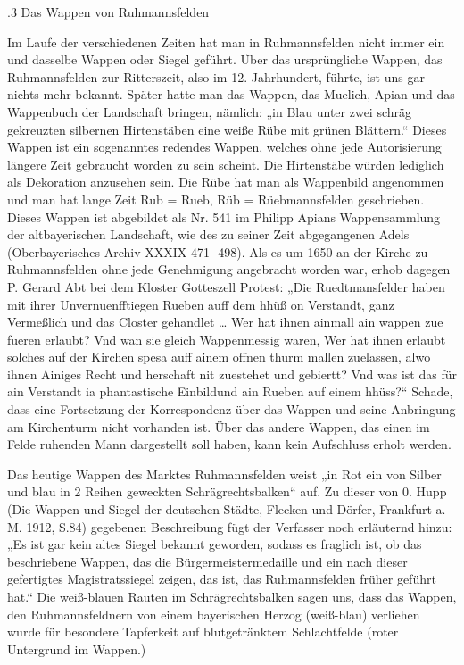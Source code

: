 \documentclass[12pt,a4paper]{book}
\begin{document}
.3 Das Wappen von Ruhmannsfelden

Im Laufe der verschiedenen Zeiten hat man in Ruhmannsfelden nicht immer ein und
dasselbe Wappen oder Siegel geführt. Über das ursprüngliche Wappen, das
Ruhmannsfelden zur Ritterszeit, also im 12. Jahrhundert, führte, ist uns gar
nichts mehr bekannt. Später hatte man das Wappen, das Muelich, Apian und das
Wappenbuch der Landschaft bringen, nämlich: „in Blau unter zwei schräg
gekreuzten silbernen Hirtenstäben eine weiße Rübe mit grünen Blättern.“ Dieses
Wappen ist ein sogenanntes redendes Wappen, welches ohne jede Autorisierung
längere Zeit gebraucht worden zu sein scheint. Die Hirtenstäbe würden lediglich
als Dekoration anzusehen sein. Die Rübe hat man als Wappenbild angenommen und
man hat lange Zeit Rub = Rueb, Rüb = Rüebmannsfelden geschrieben. Dieses Wappen
ist abgebildet als Nr. 541 im Philipp Apians Wappensammlung der altbayerischen
Landschaft, wie des zu seiner Zeit abgegangenen Adels (Oberbayerisches Archiv
XXXIX 471- 498). Als es um 1650 an der Kirche zu Ruhmannsfelden ohne jede
Genehmigung angebracht worden war, erhob dagegen P. Gerard Abt bei dem Kloster
Gotteszell Protest: „Die Ruedtmansfelder haben mit ihrer Unvernuenfftiegen
Rueben auff dem hhüß on Verstandt, ganz Vermeßlich und das Closter gehandlet …
Wer hat ihnen ainmall ain wappen zue fueren erlaubt? Vnd wan sie gleich
Wappenmessig waren, Wer hat ihnen erlaubt solches auf der Kirchen spesa auff
ainem offnen thurm mallen zuelassen, alwo ihnen Ainiges Recht und herschaft nit
zuestehet und gebiertt? Vnd was ist das für ain Verstandt ia phantastische
Einbildund ain Rueben auf einem hhüss?“ Schade, dass eine Fortsetzung der
Korrespondenz über das Wappen und seine Anbringung am Kirchenturm nicht
vorhanden ist. Über das andere Wappen, das einen im Felde ruhenden Mann
dargestellt soll haben, kann kein Aufschluss erholt werden.

Das heutige Wappen des Marktes Ruhmannsfelden weist „in Rot ein von Silber und
blau in 2 Reihen geweckten Schrägrechtsbalken“ auf. Zu dieser von 0. Hupp (Die
Wappen und Siegel der deutschen Städte, Flecken und Dörfer, Frankfurt a. M.
1912, S.84) gegebenen Beschreibung fügt der Verfasser noch erläuternd hinzu: „Es
ist gar kein altes Siegel bekannt geworden, sodass es fraglich ist, ob das
beschriebene Wappen, das die Bürgermeistermedaille und ein nach dieser
gefertigtes Magistratssiegel zeigen, das ist, das Ruhmannsfelden früher geführt
hat.“ Die weiß-blauen Rauten im Schrägrechtsbalken sagen uns, dass das Wappen,
den Ruhmannsfeldnern von einem bayerischen Herzog (weiß-blau) verliehen wurde
für besondere Tapferkeit auf blutgetränktem Schlachtfelde (roter Untergrund im
Wappen.)
\end{document}
